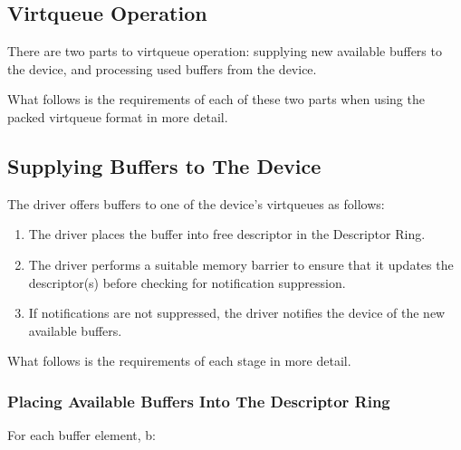 \subsection{Virtqueue Operation}\label{sec:Basic Facilities of a Virtio Device / Packed Virtqueues / Virtqueue Operation}

There are two parts to virtqueue operation: supplying new
available buffers to the device, and processing used buffers from
the device.

What follows is the requirements of each of these two parts
when using the packed virtqueue format in more detail.

\subsection{Supplying Buffers to The Device}\label{sec:Basic Facilities of a Virtio Device / Packed Virtqueues / Supplying Buffers to The Device}

The driver offers buffers to one of the device's virtqueues as follows:

\begin{enumerate}
\item The driver places the buffer into free descriptor in the Descriptor Ring.

\item The driver performs a suitable memory barrier to ensure that it updates
  the descriptor(s) before checking for notification suppression.

\item If notifications are not suppressed, the driver notifies the device
    of the new available buffers.
\end{enumerate}

What follows is the requirements of each stage in more detail.

\subsubsection{Placing Available Buffers Into The Descriptor Ring}\label{sec:Basic Facilities of a Virtio Device / Virtqueues / Supplying Buffers to The Device / Placing Available Buffers Into The Descriptor Ring}

For each buffer element, b:

